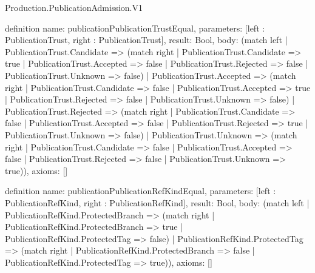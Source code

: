 \begin{lexlean}{Production.PublicationAdmission.V1}
\begin{semanticmodule}
definition{
  name: publicationPublicationTrustEqual,
  parameters: [left : PublicationTrust, right : PublicationTrust],
  result: Bool,
  body: (match left
    | PublicationTrust.Candidate => (match right
      | PublicationTrust.Candidate => true
      | PublicationTrust.Accepted => false
      | PublicationTrust.Rejected => false
      | PublicationTrust.Unknown => false)
    | PublicationTrust.Accepted => (match right
      | PublicationTrust.Candidate => false
      | PublicationTrust.Accepted => true
      | PublicationTrust.Rejected => false
      | PublicationTrust.Unknown => false)
    | PublicationTrust.Rejected => (match right
      | PublicationTrust.Candidate => false
      | PublicationTrust.Accepted => false
      | PublicationTrust.Rejected => true
      | PublicationTrust.Unknown => false)
    | PublicationTrust.Unknown => (match right
      | PublicationTrust.Candidate => false
      | PublicationTrust.Accepted => false
      | PublicationTrust.Rejected => false
      | PublicationTrust.Unknown => true)),
  axioms: []
}

definition{
  name: publicationPublicationRefKindEqual,
  parameters: [left : PublicationRefKind, right : PublicationRefKind],
  result: Bool,
  body: (match left
    | PublicationRefKind.ProtectedBranch => (match right
      | PublicationRefKind.ProtectedBranch => true
      | PublicationRefKind.ProtectedTag => false)
    | PublicationRefKind.ProtectedTag => (match right
      | PublicationRefKind.ProtectedBranch => false
      | PublicationRefKind.ProtectedTag => true)),
  axioms: []
}


\end{semanticmodule}
\end{lexlean}
